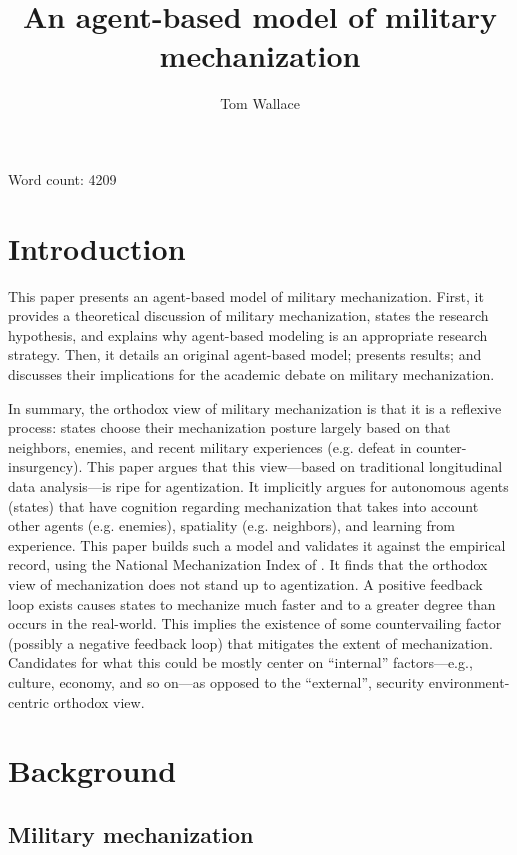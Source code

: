 \documentclass{article}
\title{An agent-based model of military mechanization}
\author{Tom Wallace}
\begin{document}
\maketitle

\begin{center}
	Word count: 4209
\end{center}
\section{Introduction}

This paper presents an agent-based model of military mechanization. First, it
provides a theoretical discussion of military mechanization, states the research
hypothesis, and explains why agent-based modeling is an appropriate research strategy.
Then, it details an original agent-based model; presents results; and discusses
their implications for the academic debate on military mechanization.

In summary, the orthodox view of military mechanization is that it is a
reflexive process: states choose their mechanization posture largely based on
that neighbors, enemies, and recent military experiences (e.g. defeat in
counter-insurgency). This paper argues
that this view---based on traditional longitudinal data analysis---is ripe for
agentization. It implicitly argues for autonomous agents (states) that have
cognition regarding mechanization that takes into account other agents (e.g.
enemies), spatiality (e.g. neighbors), and learning from experience. This paper
builds such a model and validates it against the empirical record, using the
National Mechanization Index of \cite{sechser2010army}. It finds that the 
orthodox view of mechanization does not stand up to agentization. A positive feedback loop exists causes states to
mechanize much faster and to a greater degree than occurs in the real-world.
This implies the existence of some countervailing factor (possibly a negative
feedback loop) that mitigates the extent of mechanization. Candidates for what
this could be mostly center on ``internal'' factors---e.g., culture, economy,
and so on---as opposed to the ``external'', security environment-centric
orthodox view.

\section{Background}

\subsection{Military mechanization}
\end{document}
